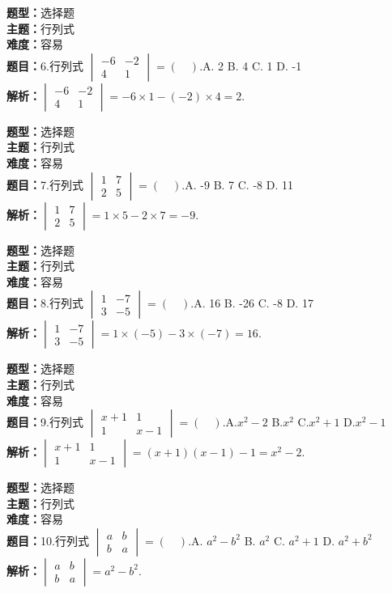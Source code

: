 \documentclass{ctexart}
\newenvironment{question}[5]{%
	\noindent\textbf{题型：}#1\\
	\textbf{主题：}#2\\
	\textbf{难度：}#3\\
	\textbf{题目：}#4\\
	\textbf{解析：}#5\\
	\vspace{1em}
}{}
\begin{document}
	\begin{question}
		{选择题}
		{行列式}
		{容易}
		{6.行列式 \(\begin{vmatrix} -6 & -2 \\ 4 & 1\end{vmatrix}=(\quad). \)A. 2 \quad B. 4 \quad C. 1 \quad D. -1}
		{\(\begin{vmatrix} -6 & -2 \\ 4 & 1\end{vmatrix}=-6 \times 1-(-2) \times 4=2.\)}
	\end{question}
	
	\begin{question}
		{选择题}
		{行列式}
		{容易}
		{7.行列式 \(\begin{vmatrix} 1 & 7 \\ 2 & 5\end{vmatrix}=(\quad). \)A. -9 \quad B. 7 \quad C. -8 \quad D. 11}
		{\(\begin{vmatrix} 1 & 7 \\ 2 & 5\end{vmatrix}=1 \times 5-2 \times 7=-9.\)}
	\end{question}
	
	\begin{question}
		{选择题}
		{行列式}
		{容易}
		{8.行列式 \(\begin{vmatrix} 1 & -7 \\ 3 & -5\end{vmatrix}=(\quad). \)A. 16 \quad B. -26 \quad C. -8 \quad D. 17}
		{\(\begin{vmatrix} 1 & -7 \\ 3 & -5\end{vmatrix}=1 \times(-5)-3 \times(-7)=16.\)}
	\end{question}
	
	
	\begin{question}
		{选择题}
		{行列式}
		{容易}
		{9.行列式 \(\begin{vmatrix} x+1 & 1 \\ 1 & x-1\end{vmatrix}=(\quad). \)A.\(x^2-2\) \quad B.\(x^2\) \quad C.\(x^2+1\) \quad D.\(x^2-1\)}
		{\(\begin{vmatrix} x+1 & 1 \\ 1 & x-1\end{vmatrix}=(x+1)(x-1)-1=x^2-2.\)}
	\end{question}
	
	\begin{question}
		{选择题}
		{行列式}
		{容易}
		{10.行列式 \(\begin{vmatrix} a & b \\ b & a\end{vmatrix}=(\quad). \)A. \(a^2-b^2\) \quad B. \(a^2\) \quad C. \(a^2+1\) \quad D. \(a^2+b^2\)}
		{\(\begin{vmatrix} a & b \\ b & a\end{vmatrix}=a^2-b^2\).}
	\end{question}
	
\end{document}

